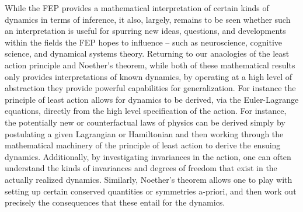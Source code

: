 While the FEP provides a mathematical interpretation of certain kinds of dynamics in terms of inference, it also, largely, remains to be seen whether such an interpretation is useful for spurring new ideas, questions, and developments within the fields the FEP hopes to influence -- such as neuroscience, cognitive science, and dynamical systems theory. Returning to our anaologies of the least action principle and Noether's theorem, while both of these mathematical results only provides interpretations of known dynamics, by operating at a high level of abstraction they provide powerful capabilities for generalization. For instance the principle of least action allows for dynamics to be derived, via the Euler-Lagrange equations, directly from the high level specification of the action. For instance, the potentially new or counterfactual laws of physics can be derived simply by postulating a given Lagrangian or Hamiltonian and then working through the mathematical machinery of the principle of least action to derive the ensuing dynamics. Additionally, by investigating invariances in the action, one can often understand the kinds of invariances and degrees of freedom that exist in the actually realized dynamics. Similarly, Noether's theorem allows one to play with setting up certain conserved quantities or symmetries a-priori, and then work out precisely the consequences that these entail for the dynamics. 

